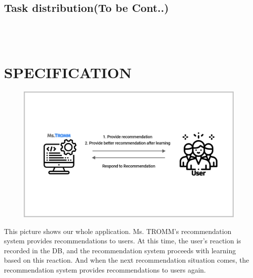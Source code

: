 \documentclass[conference]{IEEEtran}
\begin{document}
\subsection{Task distribution(To be Cont..)}  \\ \\


\section{SPECIFICATION}
    \begin{figure}[htbp]
\centerline{\includegraphics[scale=0.2]{Whole application.jpg}}
\label{fig}
\end{figure}
This picture shows our whole application. Ms. TROMM's recommendation system provides recommendations to users. At this time, the user's reaction is recorded in the DB, and the recommendation system proceeds with learning based on this reaction. And when the next recommendation situation comes, the recommendation system provides recommendations to users again. \\ \\ \\ \\ 
\end{document}
